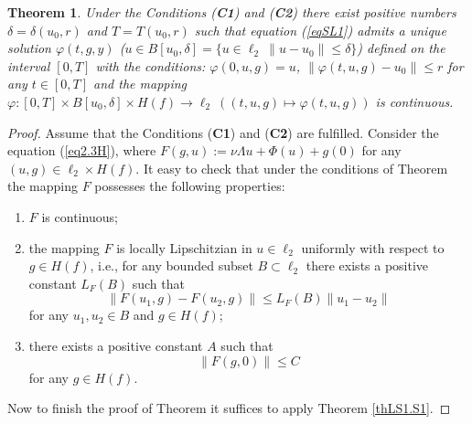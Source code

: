\documentclass{amsart}%
\newtheorem{theorem}[lemma]{Theorem}
\begin{document}
\begin{theorem}\label{th1.1} Under the Conditions (\textbf{C1}) and
(\textbf{C2}) there exist positive numbers $\delta =\delta
(u_0,r)$ and $T=T(u_0,r) $ such that equation (\ref{eqSL1}) admits
a unique solution $\varphi (t,g,y)$ ($u\in B[u_0,\delta]=\{u\in
\ell_{2}\ \|u -u_0 \| \le \delta \} $) defined on the interval
$[0,T]$ with the conditions: $\varphi (0,u,g)=u$, $\|\varphi
(t,u,g)-u_0\| \le r$ for any $t\in [0,T]$ and the mapping $
\varphi : [0,T]\times B[u_0,\delta] \times H(f) \to \ell_{2}\ (
(t,u,g)\mapsto \varphi (t,u,g))$ is continuous.
\end{theorem}
\begin{proof}
Assume that the Conditions (\textbf{C1}) and (\textbf{C2}) are
fulfilled. Consider the equation (\ref{eq2.3H}), where
$F(g,u):=\nu \Lambda u +\Phi(u)+g(0)$ for any $(u,g)\in
\ell_{2}\times H(f)$. It easy to check that under the conditions
of Theorem the mapping $F$ possesses the following properties:
\begin{enumerate}
\item $F$ is continuous; \item the mapping $F$ is locally
Lipschitzian in $u\in \ell_{2}$ uniformly with respect to $g\in
H(f)$, i.e., for any bounded subset $B\subset \ell_{2}$ there
exists a positive constant $L_{F}(B)$ such that
\begin{equation}\label{eqLB1}
\|F(u_1,g)-F(u_2,g)\|\le L_{F}(B)\|u_1-u_2\|\nonumber
\end{equation}
for any $u_1,u_2\in B$ and $g\in H(f)$; \item there exists a
positive constant $A$ such that
\begin{equation}\label{eqA1}
\|F(g,0)\|\le C\nonumber
\end{equation}
for any $g\in H(f)$.
\end{enumerate}

Now to finish the proof of Theorem it suffices to apply Theorem
\ref{thLS1.S1}.
\end{proof}
\end{document}

